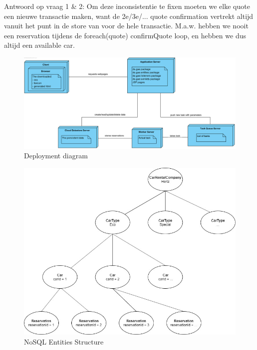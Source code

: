 \documentclass{ds-report}
\begin{document}
	Antwoord op vraag 1 & 2: Om deze inconsistentie  te fixen moeten we elke quote een nieuwe transactie maken, want de 2e/3e/... quote confirmation vertrekt altijd vanuit het punt in de store van voor de hele transactie. M.a.w. hebben we nooit een reservation tijdens de foreach(quote) {confirmQuote} loop, en hebben we dus altijd een available car.
	
	
	
	
		\clearpage

\begin{figure}
  \includegraphics[width=\linewidth]{GAE_opdracht_2_deployment.png}
  \caption{Deployment diagram}
  \label{fig:deployment_diagram}
\end{figure}	

\begin{figure}
  \includegraphics[width=\linewidth]{GAE_opdracht_2_structure.jpg}
  \caption{NoSQL Entities Structure}
  \label{fig:structure}
\end{figure}

	
	\clearpage


	
\end{document}
